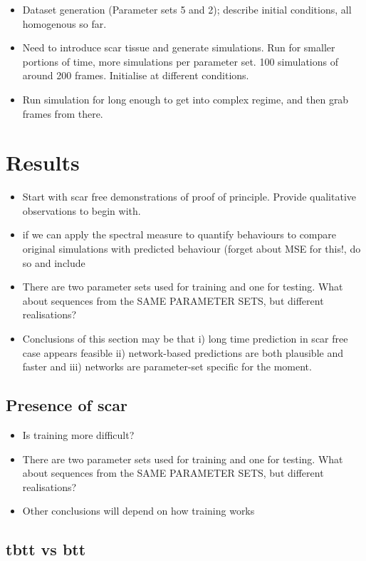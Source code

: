 \documentclass{article}
\begin{document}
    \begin{itemize}
        \item Dataset generation (Parameter sets 5 and 2); describe initial conditions, all homogenous so far. 
        \item Need to introduce scar tissue and generate simulations. Run for smaller portions of time, more simulations per parameter set. 100 simulations of around 200 frames. Initialise at different conditions.
        \item Run simulation for long enough to get into complex regime, and then grab frames from there.
    \end{itemize}
    \section{Results}
    \begin{itemize}
        \item Start with scar free demonstrations of proof of principle. Provide qualitative observations to begin with.
        \item if we can apply the spectral measure to quantify behaviours to compare original simulations with predicted behaviour (forget about MSE for this!, do so and include
        \item There are two parameter sets used for training and one for testing. What about sequences from the SAME PARAMETER SETS, but different realisations?
        \item Conclusions of this section may be that i) long time prediction in scar free case appears feasible ii) network-based predictions are both plausible and faster and iii) networks are parameter-set specific for the moment.
    \end{itemize}
    \subsection{Presence of scar}
    \begin{itemize}
        \item Is training more difficult?
        \item There are two parameter sets used for training and one for testing. What about sequences from the SAME PARAMETER SETS, but different realisations?
        \item Other conclusions will depend on how training works
    \end{itemize}
    \subsection{tbtt vs btt}
\end{document}
